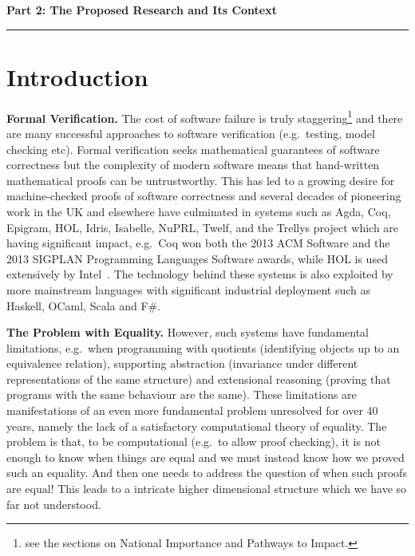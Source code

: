 \documentclass[a4paper,11pt]{article}
\newcommand{\eg}{{e.g.}\ }
\begin{document}
\newpage
\noindent
{\bf \Large Part 2: The Proposed Research and Its Context}

\vspace*{-0.23in}

\begin{center}
\rule{170mm}{.5mm}
\end{center}

\vspace*{-0.4in}

\section{Introduction}\label{sec:intro}

\vspace*{-0.1in}

{\bf Formal Verification.} The cost of software failure is truly
staggering\footnote{see the sections on National Importance and
  Pathways to Impact.} and there are many successful approaches to
software verification (\eg testing, model checking etc). Formal
verification seeks mathematical guarantees of software correctness but
the complexity of modern software means that hand-written mathematical
proofs can be untrustworthy. This has led to a growing desire for
machine-checked proofs of software correctness and several decades of
pioneering work in the UK and elsewhere have culminated in systems
such as Agda, Coq, Epigram, HOL, Idris, Isabelle, NuPRL, Twelf, and
the Trellys project which are having significant impact, \eg Coq won
both the 2013 ACM Software and the 2013 SIGPLAN Programming Languages
Software awards, while HOL is used extensively by
Intel~\cite{harrison:sfm}. The technology behind these systems is also
exploited by more mainstream languages with significant industrial
deployment such as Haskell, OCaml, Scala and F\#.

{\bf The Problem with Equality.} However, such systems have
fundamental limitations, \eg when programming with quotients
(identifying objects up to an equivalence relation), supporting
abstraction (invariance under different representations of the same
structure) and extensional reasoning (proving that programs with the
same behaviour are the same). These limitations are manifestations of
an even more fundamental problem unresolved for over 40 years, namely
the lack of a satisfactory computational theory of equality. The
problem is that, to be computational (\eg to allow proof checking), it
is not enough to know when things are equal and we must instead know
how we proved such an equality. And then one needs to address the
question of when such proofs are equal! This leads to a intricate
higher dimensional structure which we have so far not understood.
\end{document}
